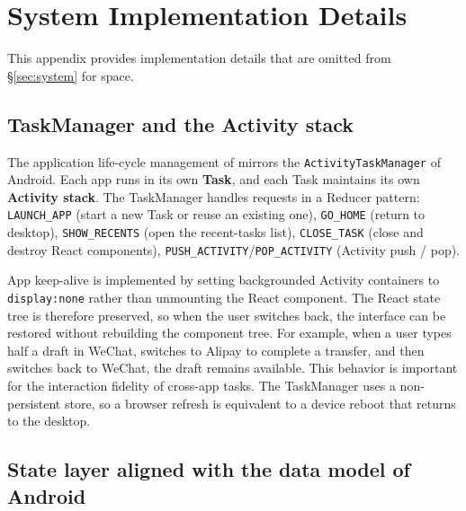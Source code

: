 
\appendix

\section{System Implementation Details}\label{app:system-detail}

This appendix provides implementation details that are omitted from §\ref{sec:system} for space.

\subsection{TaskManager and the Activity stack}

The application life-cycle management of \sys{} mirrors the \texttt{ActivityTaskManager} of Android. Each app runs in its own \textbf{Task}, and each Task maintains its own \textbf{Activity stack}. The TaskManager handles requests in a Reducer pattern: \texttt{LAUNCH\_APP} (start a new Task or reuse an existing one), \texttt{GO\_HOME} (return to desktop), \texttt{SHOW\_RECENTS} (open the recent-tasks list), \texttt{CLOSE\_TASK} (close and destroy React components), \texttt{PUSH\_ACTIVITY}/\texttt{POP\_ACTIVITY} (Activity push / pop).

App keep-alive is implemented by setting backgrounded Activity containers to \texttt{display:none} rather than unmounting the React component. The React state tree is therefore preserved, so when the user switches back, the interface can be restored without rebuilding the component tree. For example, when a user types half a draft in WeChat, switches to Alipay to complete a transfer, and then switches back to WeChat, the draft remains available. This behavior is important for the interaction fidelity of cross-app tasks. The TaskManager uses a non-persistent store, so a browser refresh is equivalent to a device reboot that returns to the desktop.

\subsection{State layer aligned with the data model of Android}


